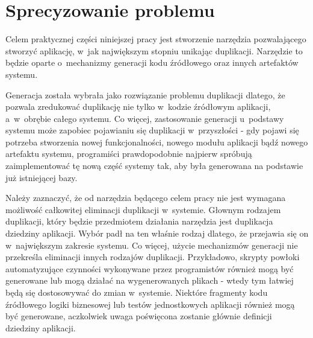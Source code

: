 \chapter{Sprecyzowanie problemu} \label{chap:the_problem}

Celem praktycznej części niniejszej pracy jest stworzenie narzędzia pozwalającego stworzyć aplikację, w~jak największym stopniu unikając duplikacji.
Narzędzie to będzie oparte o~mechanizmy generacji kodu źródłowego oraz innych artefaktów systemu.

Generacja została wybrała jako rozwiązanie problemu duplikacji dlatego, że pozwala zredukować duplikację nie tylko w~kodzie źródłowym aplikacji, a~w~obrębie całego systemu.
Co więcej, zastosowanie generacji u~podstawy systemu może zapobiec pojawianiu się duplikacji w~przyszłości - gdy pojawi się potrzeba stworzenia nowej funkcjonalności, nowego modułu aplikacji bądź nowego artefaktu systemu, programiści prawdopodobnie najpierw spróbują zaimplementować tę nową część systemy tak, aby była generowana na podstawie już istniejącej bazy.

Należy zaznaczyć, że od narzędzia będącego celem pracy nie jest wymagana możliwość całkowitej eliminacji duplikacji w~systemie.
Głownym rodzajem duplikacji, który będzie przedmiotem działania narzędzia jest duplikacja dziedziny aplikacji.
Wybór padł na ten właśnie rodzaj dlatego, że przejawia się on w~największym zakresie systemu.
Co więcej, użycie mechanizmów generacji nie przekreśla eliminacji innych rodzajów duplikacji.
Przykładowo, skrypty powłoki automatyzujące czynności wykonywane przez programistów również mogą być generowane lub mogą działać na wygenerowanych plikach - wtedy tym łatwiej będą się dostosowywać do zmian w~systemie.
Niektóre fragmenty kodu źródłowego logiki biznesowej lub testów jednostkowych aplikacji również mogą być generowane, aczkolwiek uwaga poświęcona zostanie głównie definicji dziedziny aplikacji.
